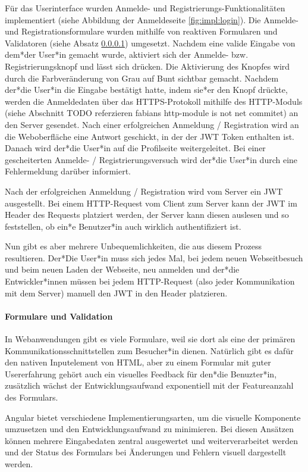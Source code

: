 Für das Userinterface wurden Anmelde- und Registrierungs-Funktionalitäten implementiert (siehe Abbildung der Anmeldeseite \ref{fig:impl:login}). Die Anmelde- und Registrationsformulare wurden mithilfe von reaktiven Formularen und Validatoren (siehe Absatz \ref{par:impl:usermanagment:reactiveForms}) umgesetzt. Nachdem eine valide Eingabe von dem*der User*in gemacht wurde, aktiviert sich der Anmelde- bzw. Registrierungsknopf und lässt sich drücken. Die Aktivierung des Knopfes wird durch die Farbveränderung von Grau auf Bunt sichtbar gemacht.  Nachdem der*die User*in die Eingabe bestätigt hatte, indem sie*er den Knopf drückte, werden die Anmeldedaten über das HTTPS-Protokoll mithilfe des HTTP-Moduls (siehe Abschnitt TODO referzieren fabians http-module is not net commitet) an den Server gesendet. Nach einer erfolgreichen Anmeldung / Registration wird an die Weboberfläche eine Antwort geschickt, in der der JWT Token enthalten ist. Danach wird der*die User*in auf die Profilseite weitergeleitet. Bei einer gescheiterten Anmelde- / Registrierungsversuch wird der*die User*in durch eine Fehlermeldung darüber informiert.

Nach der erfolgreichen Anmeldung / Registration wird vom Server ein JWT ausgestellt. Bei einem HTTP-Request vom Client zum Server kann der JWT im Header des Requests platziert werden, der Server kann diesen auslesen und so feststellen, ob ein*e Benutzer*in auch wirklich authentifiziert ist.

Nun gibt es aber mehrere Unbequemlichkeiten, die aus diesem Prozess resultieren. Der*Die User*in muss sich jedes Mal, bei jedem neuen Webseitbesuch und beim neuen Laden der Webseite, neu anmelden und der*die Entwickler*innen müssen bei jedem HTTP-Request (also jeder Kommunikation mit dem Server) manuell den JWT in den Header platzieren.

\paragraph{Formulare und Validation}
\label{par:impl:usermanagment:reactiveForms}
In Webanwendungen gibt es viele Formulare, weil sie dort als eine der primären Kommunikationsschnittstellen zum Besucher*in dienen. Natürlich gibt es dafür den nativen Inputelement von HTML, aber zu einem Formular mit guter Usererfahrung gehört auch ein visuelles Feedback für den*die Benuzter*in, zusätzlich wächst der Entwicklungsaufwand exponentiell mit der Featureanzahl des Formulars.

Angular bietet verschiedene Implementierungsarten, um die visuelle Komponente umzusetzen und den Entwicklungsaufwand zu minimieren. Bei diesen Ansätzen können mehrere Eingabedaten zentral ausgewertet und weiterverarbeitet werden und der Status des Formulars bei Änderungen und Fehlern visuell dargestellt werden. \cite[Bookmonkey - 12 Formularverarbeitung und
Validierung: Iteration IV]{AngularBuch}

